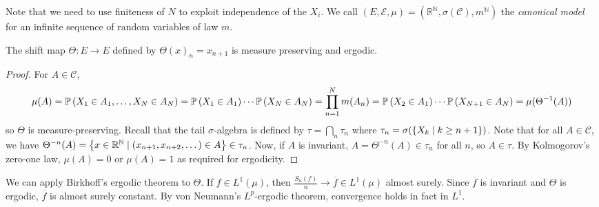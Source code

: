 Note that we need to use finiteness of \( N \) to exploit independence of the \( X_i \).
We call \( (E, \mathcal E, \mu) = (\mathbb R^{\mathbb N}, \sigma(\mathcal C), m^{\mathbb N}) \) the \emph{canonical model} for an infinite sequence of random variables of law \( m \).
\begin{theorem}
	The shift map \( \Theta \colon E \to E \) defined by \( \Theta(x)_n = x_{n+1} \) is measure preserving and ergodic.
\end{theorem}
\begin{proof}
	For \( A \in \mathcal C \),
	\[ \mu(A) = \mathbb{P}\left({X_1 \in A_1, \dots, X_N \in A_N}\right) = \mathbb{P}\left({X_1 \in A_1}\right) \cdots \mathbb{P}\left({X_N \in A_N}\right) = \prod_{n=1}^N m(A_n) = \mathbb{P}\left({X_2 \in A_1}\right) \cdots \mathbb{P}\left({X_{N+1} \in A_N}\right) = \mu(\Theta^{-1}(A)) \]
	so \( \Theta \) is measure-preserving.
	Recall that the tail \( \sigma \)-algebra is defined by \( \tau = \bigcap_n \tau_n \) where \( \tau_n = \sigma(\qty{X_k \mid k \geq n + 1}) \).
	Note that for all \( A \in \mathcal C \), we have \( \Theta^{-n}(A) = \qty{x \in \mathbb R^{\mathbb N} \mid (x_{n+1}, x_{n+2}, \dots) \in A} \in \tau_n \).
	Now, if \( A \) is invariant, \( A = \Theta^{-n}(A) \in \tau_n \) for all \( n \), so \( A \in \tau \).
	By Kolmogorov's zero-one law, \( \mu(A) = 0 \) or \( \mu(A) = 1 \) as required for ergodicity.
\end{proof}
We can apply Birkhoff's ergodic theorem to \( \Theta \).
If \( f \in L^1(\mu) \), then \( \frac{S_n(f)}{n} \to \overline f \in L^1(\mu) \) almost surely.
Since \( \overline f \) is invariant and \( \Theta \) is ergodic, \( \overline f \) is almost surely constant.
By von Neumann's \( L^p \)-ergodic theorem, convergence holds in fact in \( L^1 \).

